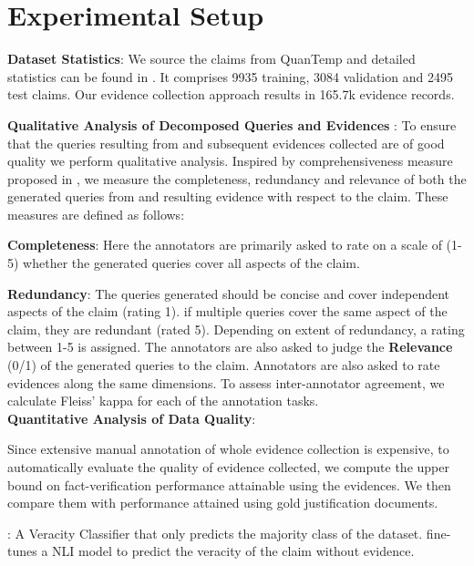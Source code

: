 \vspace{-1em}
\section{Experimental Setup}

\textbf{Dataset Statistics}: We source the claims from QuanTemp and detailed statistics can be found in \cite{quantemp}. It comprises 9935 training, 3084 validation and 2495 test claims. Our evidence collection approach results in 165.7k evidence records.

\textbf{Qualitative Analysis of Decomposed Queries and Evidences }:
To ensure that the queries resulting from \name{} and subsequent evidences collected are of good quality we perform qualitative analysis. Inspired by comprehensiveness measure proposed in \cite{claimdecomp}, we measure the completeness, redundancy and relevance of both the generated queries from \name{} and resulting evidence  with respect to the claim. These measures are defined as follows: 

\textbf{Completeness}: Here the annotators are primarily asked to rate on a scale of (1-5) whether the generated queries cover all aspects of the claim.

\textbf{Redundancy}: The queries generated should be concise and cover independent aspects of the claim (rating 1). if multiple queries cover the same aspect of the claim, they are redundant (rated 5). Depending on extent of redundancy, a rating between 1-5 is assigned. The annotators are also asked to judge the \textbf{Relevance} (0/1) of the generated queries to the claim. Annotators are also asked to rate evidences along the same dimensions. To assess inter-annotator agreement, we calculate Fleiss’ kappa \cite{fleiss}
for each of the annotation tasks. \\
\textbf{Quantitative Analysis of Data Quality}:

Since extensive manual annotation of whole evidence collection is expensive, to automatically evaluate the quality of evidence collected, we compute the upper bound on fact-verification performance attainable using the evidences. We then compare them with  performance attained using gold justification documents. 


    \textbf{ \naive{}}: A Veracity Classifier that only predicts the majority class of the dataset. \robertaclaimnoev fine-tunes a NLI model to predict the veracity of the claim without evidence. 
    
